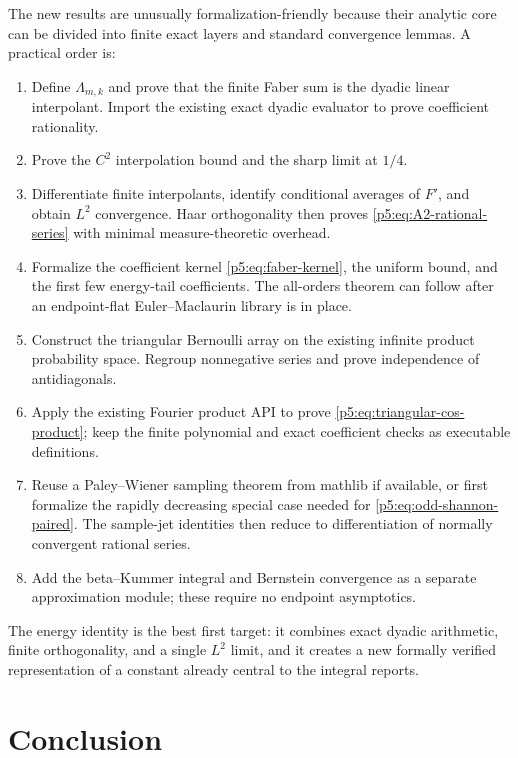 \documentclass[11pt,oneside]{article}
\theoremstyle{definition}
\begin{document}
The new results are unusually formalization-friendly because their analytic
core can be divided into finite exact layers and standard convergence lemmas.
A practical order is:

\begin{enumerate}
\item Define $\Lambda_{m,k}$ and prove that the finite Faber sum is the dyadic
      linear interpolant.  Import the existing exact dyadic evaluator to prove
      coefficient rationality.
\item Prove the $C^2$ interpolation bound and the sharp limit at $1/4$.
\item Differentiate finite interpolants, identify conditional averages of
      $F'$, and obtain $L^2$ convergence.  Haar orthogonality then proves
      \eqref{p5:eq:A2-rational-series} with minimal measure-theoretic overhead.
\item Formalize the coefficient kernel \eqref{p5:eq:faber-kernel}, the uniform
      bound, and the first few energy-tail coefficients.  The all-orders
      theorem can follow after an endpoint-flat Euler--Maclaurin library is in
      place.
\item Construct the triangular Bernoulli array on the existing infinite
      product probability space.  Regroup nonnegative series and prove
      independence of antidiagonals.
\item Apply the existing Fourier product API to prove
      \eqref{p5:eq:triangular-cos-product}; keep the finite polynomial and exact
      coefficient checks as executable definitions.
\item Reuse a Paley--Wiener sampling theorem from mathlib if available, or
      first formalize the rapidly decreasing special case needed for
      \eqref{p5:eq:odd-shannon-paired}.  The sample-jet identities then reduce to
      differentiation of normally convergent rational series.
\item Add the beta--Kummer integral and Bernstein convergence as a separate
      approximation module; these require no endpoint asymptotics.
\end{enumerate}

The energy identity is the best first target: it combines exact dyadic
arithmetic, finite orthogonality, and a single $L^2$ limit, and it creates a
new formally verified representation of a constant already central to the
integral reports.

\section{Conclusion}
\label{p5:sec:conclusion}
\end{document}
